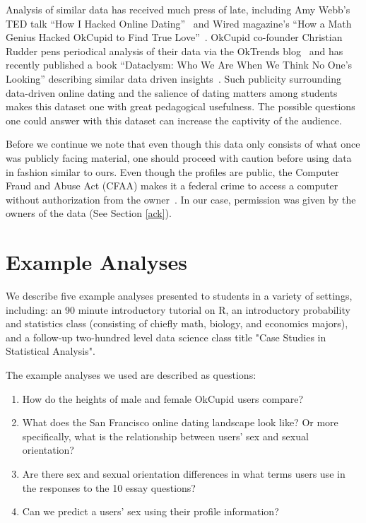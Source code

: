 \documentclass{article}\usepackage[]{graphicx}\usepackage[]{color}
\begin{document}
Analysis of similar data has received much press of late, including Amy Webb's TED talk ``How I Hacked Online Dating''~\cite{TED} and Wired magazine's ``How a Math Genius Hacked OkCupid to Find True Love''~\cite{Wired}.  OkCupid co-founder Christian Rudder pens periodical analysis of their data via the OkTrends blog~\cite{OkTrends} and has recently published a book ``Dataclysm: Who We Are When We Think No One's Looking'' describing similar data driven insights~\cite{dataclysm}.  Such publicity surrounding data-driven online dating and the salience of dating matters among students makes this dataset one with great pedagogical usefulness.  The possible questions one could answer with this dataset can increase the captivity of the audience.

Before we continue we note that even though this data only consists of what once was publicly facing material, one should proceed with caution before using data in fashion similar to ours.  Even though the profiles are public, the Computer Fraud and Abuse Act (CFAA) makes it a federal crime to access a computer without authorization from the owner~\cite{pando}.  In our case, permission was given by the owners of the data (See Section \ref{ack}).










%
\section{Example Analyses}\label{analyses}
%
We describe five example analyses presented to students in a variety of settings, including: an 90 minute introductory tutorial on R, an introductory probability and statistics class (consisting of chiefly math, biology, and economics majors), and a follow-up two-hundred level data science class title "Case Studies in Statistical Analysis".

The example analyses we used are described as questions:

\begin{enumerate}
\item How do the heights of male and female OkCupid users compare?
\item What does the San Francisco online dating landscape look like?  Or more specifically, what is the relationship between users' sex and sexual orientation?
\item Are there sex and sexual orientation differences in what terms users use in the responses to the 10 essay questions?
\item Can we predict a users' sex using their profile information?
\end{enumerate}
\end{document}
